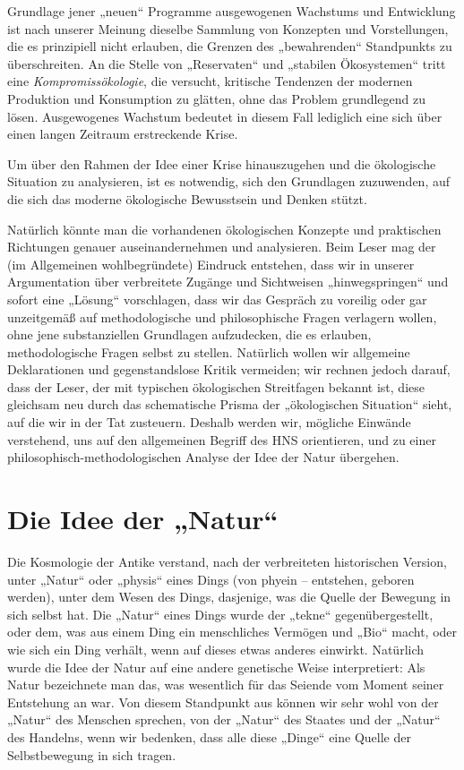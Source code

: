 \documentclass[11pt,a4paper]{article}
\begin{document}
Grundlage jener „neuen“ Programme ausgewogenen Wachstums und Entwicklung ist
nach unserer Meinung dieselbe Sammlung von Konzepten und Vorstellungen, die es
prinzipiell nicht erlauben, die Grenzen des „bewahrenden“ Standpunkts zu
überschreiten. An die Stelle von „Reservaten“ und „stabilen Ökosystemen“ tritt
eine \emph{Kompromissökologie}, die versucht, kritische Tendenzen der modernen
Produktion und Konsumption zu glätten, ohne das Problem grundlegend zu lösen.
Ausgewogenes Wachstum bedeutet in diesem Fall lediglich eine sich über einen
langen Zeitraum erstreckende Krise.

Um über den Rahmen der Idee einer Krise hinauszugehen und die ökologische
Situation zu analysieren, ist es notwendig, sich den Grundlagen zuzuwenden,
auf die sich das moderne ökologische Bewusstsein und Denken stützt.

Natürlich könnte man die vorhandenen ökologischen Konzepte und praktischen
Richtungen genauer auseinandernehmen und analysieren. Beim Leser mag der (im
Allgemeinen wohlbegründete) Eindruck entstehen, dass wir in unserer
Argumentation über verbreitete Zugänge und Sichtweisen „hinwegspringen“ und
sofort eine „Lösung“ vorschlagen, dass wir das Gespräch zu voreilig oder gar
unzeitgemäß auf methodologische und philosophische Fragen verlagern wollen,
ohne jene substanziellen Grundlagen aufzudecken, die es erlauben,
methodologische Fragen selbst zu stellen. Natürlich wollen wir allgemeine
Deklarationen und gegenstandslose Kritik vermeiden; wir rechnen jedoch darauf,
dass der Leser, der mit typischen ökologischen Streitfagen bekannt ist, diese
gleichsam neu durch das schematische Prisma der „ökologischen Situation“
sieht, auf die wir in der Tat zusteuern. Deshalb werden wir, mögliche Einwände
verstehend, uns auf den allgemeinen Begriff des HNS orientieren, und zu einer
philosophisch-methodologischen Analyse der Idee der Natur übergehen.

\section{Die Idee der „Natur“}

Die Kosmologie der Antike verstand, nach der verbreiteten historischen
Version, unter „Natur“ oder „physis“ eines Dings (von phyein -- entstehen,
geboren werden), unter dem Wesen des Dings, dasjenige, was die Quelle der
Bewegung in sich selbst hat. Die „Natur“ eines Dings wurde der „tekne“
gegenübergestellt, oder dem, was aus einem Ding ein menschliches Vermögen und
„Bio“ macht, oder wie sich ein Ding verhält, wenn auf dieses etwas anderes
einwirkt. Natürlich wurde die Idee der Natur auf eine andere genetische Weise
interpretiert: Als Natur bezeichnete man das, was wesentlich für das Seiende
vom Moment seiner Entstehung an war.  Von diesem Standpunkt aus können wir
sehr wohl von der „Natur“ des Menschen sprechen, von der „Natur“ des Staates
und der „Natur“ des Handelns, wenn wir bedenken, dass alle diese „Dinge“ eine
Quelle der Selbstbewegung in sich tragen.
\end{document}
